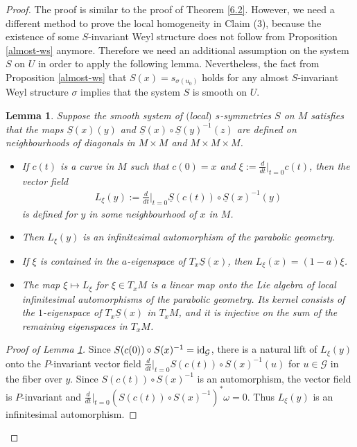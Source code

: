 \documentclass[pdftex]{sigma}
\newcommand{\om}{\omega}
\newcommand{\si}{\sigma}
\newcommand{\un}{\underline}
\newcommand{\ba}{\mathcal{G}}
\newcommand{\id}{{\rm id}}
\numberwithin{equation}{section}
\newtheorem{Lemma}[Theorem]{Lemma}
\begin{document}
\begin{proof}
The proof is similar to the proof of Theorem \ref{6.2}. However, we need a dif\/ferent method to prove the local homogeneity in Claim (3), because the existence of some $S$-invariant Weyl structure does not follow from Proposition \ref{almost-ws} anymore. Therefore we need an additional assumption on the system $S$ on $U$ in order to apply the following lemma. Nevertheless, the fact from Proposition \ref{almost-ws} that $S(x)=s_{\si(u_0)}$ holds for any almost $S$-invariant Weyl structure $\si$ implies that the system $S$ is smooth on $U$.

\begin{Lemma}\label{infaut}
Suppose the smooth system of $($local$)$ $s$-symmetries $S$ on $M$ satisfies that the maps $\un S(x)(y)$ and $\un S(x)\circ \un S(y)^{-1}(z)$ are defined on neighbourhoods of diagonals in $M\times M$ and $M\times M\times M$.
\begin{itemize}\itemsep=0pt
\item If $c(t)$ is a curve in $M$ such that $c(0)=x$ and $\xi:=\frac{d}{dt}|_{t=0}c(t)$,
then the vector field
\begin{gather*}L_\xi(y):=\frac{d}{dt}\Big|_{t=0} \un S(c(t)) \circ \un S(x)^{-1}(y)\end{gather*}
 is defined for $y$ in some neighbourhood of $x$ in $M$.
\item Then $L_\xi(y)$ is an infinitesimal automorphism of the parabolic geometry.
\item If $\xi$ is contained in the $a$-eigenspace of $T_x\un S(x)$, then $L_\xi(x)=(1-a)\xi$.
\item The map $\xi\mapsto L_\xi$ for $\xi \in T_xM$ is a linear map onto the Lie algebra of local infinitesimal automorphisms of the parabolic geometry. Its kernel consists of the $1$-eigenspace of $T_x\un S(x)$ in $T_xM$, and it is injective on the sum of the remaining eigenspaces in $T_xM$.
\end{itemize}
\end{Lemma}
\begin{proof}[Proof of Lemma \ref{infaut}]
Since $S(c(0)) \circ S(x)^{-1}=\id_\ba$, there is a natural lift of $L_\xi(y)$ onto the $P$-invariant vector f\/ield $\frac{d}{dt}|_{t=0}S(c(t))\circ S(x)^{-1}(u)$ for $u\in \ba$ in the f\/iber over $y$. Since $S(c(t)) \circ S(x)^{-1}$ is an automorphism, the vector f\/ield is $P$-invariant and $\frac{d}{dt}|_{t=0}(S(c(t)) \circ S(x)^{-1})^*\om=0$. Thus $L_\xi(y)$ is an inf\/initesimal automorphism.


\end{proof}
\end{proof}
\end{document}
